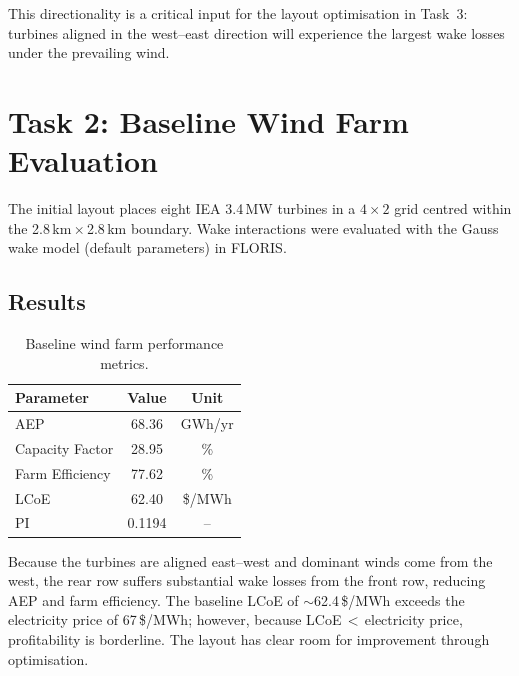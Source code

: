\documentclass[11pt,a4paper]{article}
\begin{document}
This directionality is a critical input for the layout optimisation in Task~3: turbines
aligned in the west--east direction will experience the largest wake losses under the
prevailing wind.

\section{Task 2: Baseline Wind Farm Evaluation}

The initial layout places eight IEA 3.4\,MW turbines in a $4 \times 2$ grid centred within
the 2.8\,km\,$\times$\,2.8\,km boundary. Wake interactions were evaluated with the
Gauss wake model (default parameters) in FLORIS.

\subsection{Results}

\begin{table}[h!]
    \centering
    \caption{Baseline wind farm performance metrics.}
    \label{tab:baseline}
    \begin{tabular}{lcc}
        \toprule
        \textbf{Parameter} & \textbf{Value} & \textbf{Unit} \\
        \midrule
        AEP                  & 68.36  & GWh/yr  \\
        Capacity Factor      & 28.95  & \%      \\
        Farm Efficiency      & 77.62    & \%      \\
        LCoE                 & 62.40  & \$/MWh  \\
        PI                   & 0.1194  & --  \\
        \bottomrule
    \end{tabular}
\end{table}

Because the turbines are aligned east--west and dominant winds come from the west, the
rear row suffers substantial wake losses from the front row, reducing AEP and farm
efficiency. The baseline LCoE of $\sim$62.4\,\$/MWh exceeds the electricity price of
67\,\$/MWh; however, because LCoE\,$<$\,electricity price, profitability is borderline.
The layout has clear room for improvement through optimisation.

\end{document}
